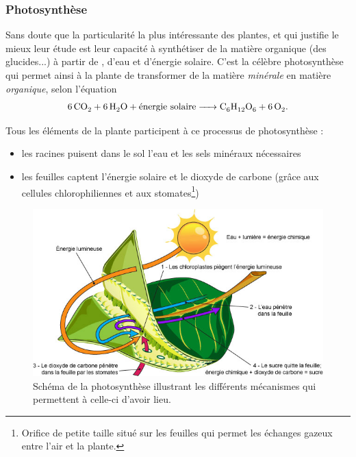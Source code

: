 \subsubsection{Photosynthèse}
\label{subsubsec:photosynthese}
Sans doute que la particularité la plus intéressante des plantes, et qui justifie le mieux leur étude est leur capacité à synthétiser de la matière organique (des glucides...) à partir de , d'eau et d'énergie solaire. C'est la célèbre photosynthèse qui permet ainsi à la plante de 
transformer de la matière \emph{minérale} en matière \emph{organique},
selon l'équation
\begin{equation}
	\ce{6CO2 + 6H2O + \text{énergie solaire} -> C6H12O6 + 6O2 }.
  \label{eq:photosynthese}
\end{equation}

Tous les éléments de la plante participent à ce processus de photosynthèse :
\begin{itemize}
	\item les racines puisent dans le sol l'eau et les sels minéraux nécessaires		
	\item les feuilles captent l'énergie solaire et le dioxyde de carbone 
  (grâce aux cellules chlorophiliennes 
  et aux stomates\footnote{Orifice de petite taille situé sur les feuilles 
  qui permet les échanges gazeux entre l'air et la plante.})
\end{itemize}

\begin{figure}[h]
	\begin{center}
  \includegraphics[scale=0.51]{./img/photosynthese.jpg}
  \caption{Schéma de la photosynthèse illustrant les différents 
  mécanismes qui permettent à celle-ci d'avoir lieu.}
  \label{fig:photosynthèse}
	\end{center}
\end{figure}

